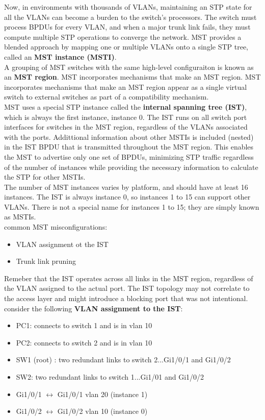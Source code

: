 \documentclass{article}
\begin{document}
Now, in environments with thousands of VLANs, maintaining an STP state for all the VLANs can become a burden to the switch's processors. The switch must process BPDUs for every VLAN, and when a major trunk link fails, they must compute multiple STP operations to converge the network. MST provides a blended approach by mapping one or multiple VLANs onto a single STP tree, called an \textbf{MST instance (MSTI)}.\\

A grouping of MST switches with the same high-level configuraiton is known as an \textbf{MST region}. MST incorporates mechanisms that make an MST region. MST incorporates mechanisms that make an MST region appear as a single virtual switch to external switches as part of a compatibility mechanism.\\

MST uses a special STP instance called the \textbf{internal spanning tree (IST)}, which is always the first instance, instance 0. The IST runs on all switch port interfaces for switches in the MST region, regardless of the VLANs associated with the ports. Addittional information about other MSTIs is included (nested) in the IST BPDU that is transmitted throughout the MST region. This enables the MST to advertise only one set of BPDUs, minimizing STP traffic regardless of the number of instances while providing the necessary information to calculate the STP for other MSTIs.\\

The number of MST instances varies by platform, and should have at least 16 instances. The IST is always instance 0, so instances 1 to 15 can support other VLANs. There is not a special name for instances 1 to 15; they are simply known as MSTIs.\\

common MST misconfigurations:
	\begin{itemize}
		\item VLAN assignment ot the IST
		\item Trunk link pruning
	\end{itemize}

Remeber that the IST operates across all links in the MST region, regardless of the VLAN assigned to the actual port. The IST topology may not correlate to the access layer and might introduce a blocking port that was not intentional.\\

consider the following \textbf{VLAN assignment to the IST}:
	\begin{itemize}
		\item PC1: connects to switch 1 and is in vlan 10
		\item PC2: connects to switch 2 and is in vlan 10
		\item SW1 (root) : two redundant links to switch 2...Gi1/0/1 and Gi1/0/2 
		\item SW2: two redundant links to switch 1...Gi1/01 and Gi1/0/2
		\item Gi1/0/1 $\leftrightarrow$ Gi1/0/1 vlan 20 (instance 1)\\
		\item Gi1/0/2 $\leftrightarrow$ Gi1/0/2 vlan 10 (instance 0)
	\end{itemize}
\end{document}
